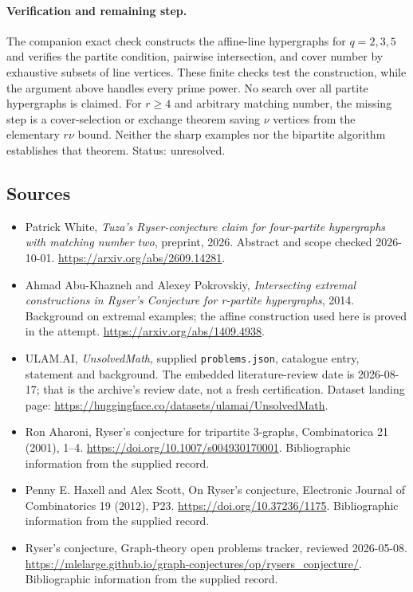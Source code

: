 \documentclass[11pt,a4paper]{article}
\begin{document}
\paragraph{Verification and remaining step.}
The companion exact check constructs the affine-line hypergraphs for
$q=2,3,5$ and verifies the partite condition, pairwise intersection,
and cover number by exhaustive subsets of line vertices. These finite
checks test the construction, while the argument above handles every
prime power. No search over all partite hypergraphs is claimed.
For $r\geq4$ and arbitrary matching number, the missing step is a
cover-selection or exchange theorem saving $\nu$ vertices from the
elementary $r\nu$ bound. Neither the sharp examples nor the bipartite
algorithm establishes that theorem. Status: unresolved.

\subsection{Sources}

{\small

\begin{itemize}
\item[Additional source A] Patrick White, \emph{Tuza's Ryser-conjecture claim for four-partite hypergraphs with matching number two}, preprint, 2026. Abstract and scope checked 2026-10-01. \url{https://arxiv.org/abs/2609.14281}.
\item[Additional source B] Ahmad Abu-Khazneh and Alexey Pokrovskiy, \emph{Intersecting extremal constructions in Ryser's Conjecture for r-partite hypergraphs}, 2014. Background on extremal examples; the affine construction used here is proved in the attempt. \url{https://arxiv.org/abs/1409.4938}.


\item[\hypertarget{source:statement:1}{S1}] ULAM.AI, \emph{UnsolvedMath}, supplied \texttt{problems.json}, catalogue entry, statement and background. The embedded literature-review date is 2026-08-17; that is the archive’s review date, not a fresh certification. Dataset landing page: \url{https://huggingface.co/datasets/ulamai/UnsolvedMath}.

\item[\hypertarget{source:statement:2}{S2}] Ron Aharoni, Ryser's conjecture for tripartite 3-graphs, Combinatorica 21 (2001), 1–4. \url{https://doi.org/10.1007/s004930170001}. Bibliographic information from the supplied record.

\item[\hypertarget{source:statement:3}{S3}] Penny E. Haxell and Alex Scott, On Ryser's conjecture, Electronic Journal of Combinatorics 19 (2012), P23. \url{https://doi.org/10.37236/1175}. Bibliographic information from the supplied record.

\item[\hypertarget{source:statement:4}{S4}] Ryser's conjecture, Graph-theory open problems tracker, reviewed 2026-05-08. \url{https://mlelarge.github.io/graph-conjectures/op/rysers_conjecture/}. Bibliographic information from the supplied record.

\end{itemize}

}

\label{end:statement}
\end{document}
